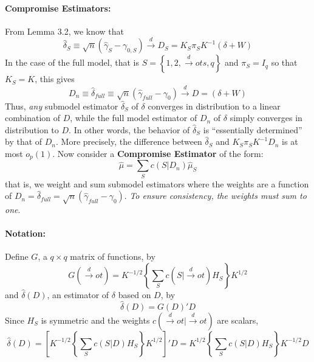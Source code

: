 \documentclass[12pt]{article}
\theoremstyle{definition}
\begin{document}
\paragraph{Compromise Estimators:} From Lemma 3.2, we know that 
	$$
	\hat{\delta}_S \equiv \sqrt{n} \left(\hat{\gamma}_S - \gamma_{0,S}\right)\overset{d}{\rightarrow} D_S = K_S\pi_S K^{-1}(\delta + W)
$$
In the case of the full model, that is $S = \left\{1,2, \overset{d}{\rightarrow}ots, q \right\}$ and $\pi_S = I_q$ so that $K_S = K$, this gives
	$$
	D_n \equiv \hat{\delta}_{full} \equiv \sqrt{n} \left(\hat{\gamma}_{full} - \gamma_0\right)\overset{d}{\rightarrow} D = (\delta + W)
$$
Thus, \emph{any} submodel estimator $\hat{\delta}_S$ of $\delta$ converges in distribution to a linear combination of $D$, while the full model estimator of $D_n$ of $\delta$ simply converges in distribution to $D$. In other words, the behavior of $\hat{\delta}_S$ is ``essentially determined'' by that of $D_n$. 
More precisely, the difference between $\hat{\delta}_S$ and $K_S \pi_S K^{-1}D_n$ is at most $o_p(1)$. Now consider a \textbf{Compromise Estimator} of the form:
	$$
	\hat{\mu} = \sum_S c\left(S|D_n\right)\hat{\mu}_S
$$
that is, we weight and sum submodel estimators where the weights are a function of $D_n = \hat{\delta}_{full} =\sqrt{n}(\hat{\gamma}_{full}-\gamma_0)$. \emph{To ensure consistency, the weights must sum to one}.

\paragraph{Notation:} Define $G$, a $q\times q$ matrix of functions, by
	$$
	G(\overset{d}{\rightarrow}ot) = K^{-1/2} \left\{\sum_S c(S|\overset{d}{\rightarrow}ot) H_S  \right\} K^{1/2}
$$
and $\hat{\delta}(D)$, an estimator of $\delta$ based on $D$, by
	$$
	\hat{\delta}(D) = G(D)'D 
$$
Since $H_S$ is symmetric and the weights $c(\overset{d}{\rightarrow}ot|\overset{d}{\rightarrow}ot)$ are scalars,
	$$
	\hat{\delta}(D) = \left[K^{-1/2} \left\{\sum_S c(S|D) H_S  \right\} K^{1/2}\right]'D = K^{1/2} \left\{\sum_S c(S|D) H_S  \right\} K^{-1/2} D
$$
\end{document}
